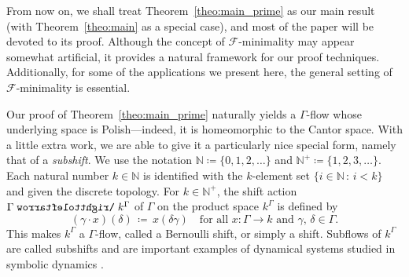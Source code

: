 \documentclass[11pt,reqno,psamsfonts]{amsart}
\theoremstyle{bfnote}
\theoremstyle{definition}
\theoremstyle{remark}
\newcommand{\0}{\varnothing}
\newcommand{\set}[1]{\{#1\}}
\newcommand{\defeq}{\coloneqq}
\newcommand{\red}[1]{{\color{red}#1}}
\newcommand{\todo}[1]{\red{\textbf{\upshape{[#1]}}}}
\newcommand{\emphd}[1]{{\fontseries{b}\selectfont\textsf{#1}}}
\newcommand{\acts}{\mathrel{\reflectbox{$\righttoleftarrow$}}}
\newcommand{\G}{\Gamma}
\newcommand{\N}{\mathbb{N}}
\numberwithin{equation}{section}
\begin{document}
    From now on, we shall treat Theorem~\ref{theo:main_prime} as our main result (with Theorem~\ref{theo:main} as a special case), and most of the paper will be devoted to its proof. Although the concept of $\mathcal{F}$-minimality may appear somewhat artificial, it provides a natural framework for our proof techniques. Additionally, for some of the %
    applications we present here, %
    the general setting of $\mathcal{F}$-minimality is essential. %


    
    
    Our proof of Theorem~\ref{theo:main_prime} naturally yields a $\G$-flow whose underlying space is Polish---indeed, it is homeomorphic to the Cantor space. With a little extra work, we are able to give it a particularly nice special form, namely that of a \emph{subshift}. %
    We use the notation %
    $\N \defeq \set{0,1,2,\ldots}$ and $\N^+\defeq\set{1,2,3,\ldots}$. %
    Each natural number
    $k \in \N$ is identified with the $k$-element set $\set{i \in \N \,:\, i < k}$ and given the discrete topology. For $k \in \N^+$, the \emphd{shift action} $\G \acts k^\G$ %
    of $\G$ on the product space $k^\G$ is defined by
    \[
        (\gamma \cdot x)(\delta) \,\defeq\, x(\delta \gamma) \quad \text{for all $x \colon \G \to k$ and $\gamma$, $\delta \in \G$}.
    \]
    This makes $k^\G$ a %
    $\G$-flow, called a \emphd{Bernoulli shift}, or simply a \emphd{shift}. Subflows of $k^\G$ are called \emphd{subshifts} and are important examples of dynamical systems %
    studied in {symbolic dynamics} \cite{subshifts1,subshifts2}. 
\end{document}

